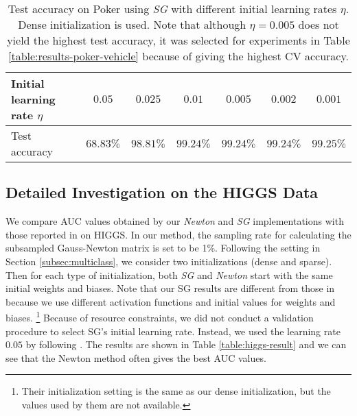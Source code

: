 \documentclass[12pt]{article}
\begin{document}
\begin{table}[t]
\begin{center}
\caption{Test accuracy on {\sf Poker} using {\sl SG} with different initial learning rates $\eta$. Dense initialization is used. 
Note that although $\eta = 0.005$ does not yield the highest test accuracy, it was selected for experiments in Table \ref{table:results-poker-vehicle} because of giving the highest CV accuracy.}
\label{table:poker-lr}
\begin{tabular}{l c c c c c c}
Initial learning rate $\eta$ & $0.05$ & $0.025$ & $0.01$ & $0.005$ & $0.002$ & $0.001$ \\
\hline
Test accuracy & $68.83\%$ & $98.81\%$ & $99.24\%$ & $99.24\%$ & $99.24\%$ & $99.25\%$ 
\end{tabular}
\end{center}
\end{table}

\subsection{Detailed Investigation on the {\sf HIGGS} Data}
\label{subsec:compare-sgd}
We compare AUC values obtained by our {\sl Newton} and {\sl SG} implementations with those reported in \cite{PB14a} on {\sf HIGGS}. In our method, the sampling rate for calculating the subsampled Gauss-Newton matrix is set to be 1\%. Following the setting in Section \ref{subsec:multiclass}, we consider two initializations (dense and sparse). Then for each type of initialization, both {\sl SG} and {\sl Newton} start with the same initial weights and biases. 
Note that our SG results are different from those in \cite{PB14a} because we use different activation functions and initial values for weights and biases.%
\footnote{Their initialization setting is the same as our dense initialization, but the values used by them are not available.} %
Because of resource constraints, we did not conduct a validation procedure to select SG's initial learning rate. Instead, we used the learning rate $0.05$ by following \cite{PB14a}. The results are shown in Table \ref{table:higgs-result} and we can see that the Newton method often gives the best AUC values.
\end{document}
